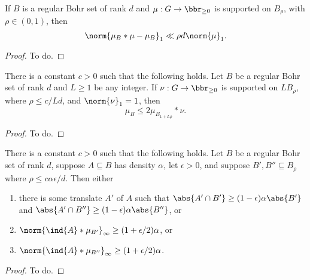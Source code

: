 \begin{lemma}\label{reg-conv}
If $B$ is a regular Bohr set of rank $d$ and $\mu:G\to\bbr_{\geq 0}$ is supported on $B_\rho$, with $\rho \in (0,1)$, then
\[ \norm{ \mu_B*\mu - \mu_B }_{1} \ll \rho d\norm{\mu}_1. \]
\end{lemma}
\begin{proof}
To do.
\end{proof}

\begin{lemma}\label{bohr-majorise}
There is a constant $c>0$ such that the following holds.  Let $B$ be a regular Bohr set of rank $d$ and $L\geq 1$ be any integer. If $\nu:G\to\bbr_{\geq 0}$ is supported on $L B_\rho$, where $\rho \leq c/Ld$, and $\norm{\nu}_1=1$, then 
\[\mu_B \leq 2\mu_{B_{1+L\rho}}\ast \nu.\]
\end{lemma}
\begin{proof}
To do.
\end{proof}

\begin{lemma}\label{bourgain-trick}
There is a constant $c>0$ such that the following holds. Let $B$ be a regular Bohr set of rank $d$, suppose $A\subseteq B$ has density $\alpha$, let $\epsilon>0$, and suppose $B',B''\subseteq B_\rho$ where $\rho\leq c\alpha\epsilon/d$. Then either
\begin{enumerate}
\item there is some translate $A'$ of $A$ such that $\abs{A'\cap B'}\geq (1-\epsilon)\alpha\abs{B'}$ and $\abs{A'\cap B''}\geq (1-\epsilon)\alpha \abs{B''}$, or 
\item $\norm{\ind{A}\ast \mu_{B'}}_\infty\geq (1+\epsilon/2)\alpha$, or
\item $\norm{\ind{A}\ast \mu_{B''}}_\infty \geq (1+\epsilon/2)\alpha$.
\end{enumerate}
\end{lemma}
\begin{proof}
To do.
\end{proof}
